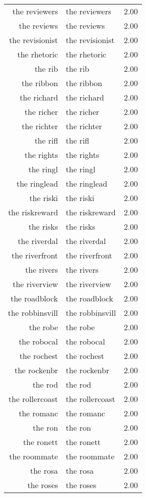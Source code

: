 \begin{table}[ht]
\begin{tabular}{rlr}
  the reviewers & the reviewers & 2.00 \\ 
  the reviews & the reviews & 2.00 \\ 
  the revisionist & the revisionist & 2.00 \\ 
  the rhetoric & the rhetoric & 2.00 \\ 
  the rib & the rib & 2.00 \\ 
  the ribbon & the ribbon & 2.00 \\ 
  the richard & the richard & 2.00 \\ 
  the richer & the richer & 2.00 \\ 
  the richter & the richter & 2.00 \\ 
  the rifl & the rifl & 2.00 \\ 
  the rights & the rights & 2.00 \\ 
  the ringl & the ringl & 2.00 \\ 
  the ringlead & the ringlead & 2.00 \\ 
  the riski & the riski & 2.00 \\ 
  the riskreward & the riskreward & 2.00 \\ 
  the risks & the risks & 2.00 \\ 
  the riverdal & the riverdal & 2.00 \\ 
  the riverfront & the riverfront & 2.00 \\ 
  the rivers & the rivers & 2.00 \\ 
  the riverview & the riverview & 2.00 \\ 
  the roadblock & the roadblock & 2.00 \\ 
  the robbinsvill & the robbinsvill & 2.00 \\ 
  the robe & the robe & 2.00 \\ 
  the robocal & the robocal & 2.00 \\ 
  the rochest & the rochest & 2.00 \\ 
  the rockenbr & the rockenbr & 2.00 \\ 
  the rod & the rod & 2.00 \\ 
  the rollercoast & the rollercoast & 2.00 \\ 
  the romanc & the romanc & 2.00 \\ 
  the ron & the ron & 2.00 \\ 
  the ronett & the ronett & 2.00 \\ 
  the roommate & the roommate & 2.00 \\ 
  the rosa & the rosa & 2.00 \\ 
  the roses & the roses & 2.00 \\ 

\end{tabular}
\end{table}
